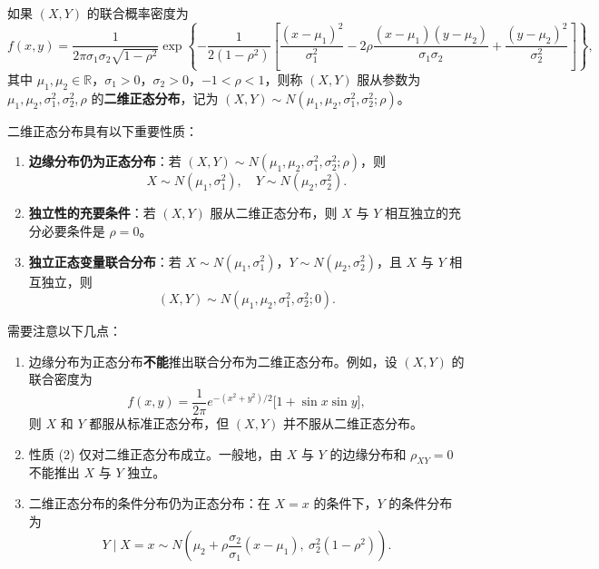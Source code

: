 ﻿\documentclass[lang=cn,11pt]{elegantbook}
\begin{document}
\begin{definition}[二维正态分布] \label{def:2d-normal}
如果 $(X,Y)$ 的联合概率密度为
\[
f(x,y) = \frac{1}{2\pi\sigma_1\sigma_2\sqrt{1-\rho^2}}\exp\left\{-\frac{1}{2(1-\rho^2)}\left[\frac{(x-\mu_1)^2}{\sigma_1^2} - 2\rho\frac{(x-\mu_1)(y-\mu_2)}{\sigma_1\sigma_2} + \frac{(y-\mu_2)^2}{\sigma_2^2}\right]\right\},
\]
其中 $\mu_1, \mu_2 \in \mathbb{R}$，$\sigma_1 > 0$，$\sigma_2 > 0$，$-1 < \rho < 1$，则称 $(X,Y)$ 服从参数为 $\mu_1, \mu_2, \sigma_1^2, \sigma_2^2, \rho$ 的\textbf{二维正态分布}，记为 $(X,Y) \sim N(\mu_1, \mu_2, \sigma_1^2, \sigma_2^2; \rho)$。
\end{definition}

\begin{property}\label{prop:2d-normal}
二维正态分布具有以下重要性质：
\begin{enumerate}
    \item \textbf{边缘分布仍为正态分布}：若 $(X,Y) \sim N(\mu_1, \mu_2, \sigma_1^2, \sigma_2^2; \rho)$，则
    \[
    X \sim N(\mu_1, \sigma_1^2), \quad Y \sim N(\mu_2, \sigma_2^2).
    \]
    \item \textbf{独立性的充要条件}：若 $(X,Y)$ 服从二维正态分布，则 $X$ 与 $Y$ 相互独立的充分必要条件是 $\rho = 0$。
    \item \textbf{独立正态变量联合分布}：若 $X \sim N(\mu_1, \sigma_1^2)$，$Y \sim N(\mu_2, \sigma_2^2)$，且 $X$ 与 $Y$ 相互独立，则
    \[
    (X,Y) \sim N(\mu_1, \mu_2, \sigma_1^2, \sigma_2^2; 0).
    \]
\end{enumerate}
\end{property}

\begin{note}
需要注意以下几点：
\begin{enumerate}
    \item 边缘分布为正态分布\textbf{不能}推出联合分布为二维正态分布。例如，设 $(X,Y)$ 的联合密度为
    \[
    f(x,y) = \frac{1}{2\pi}e^{-(x^2+y^2)/2}\bigl[1 + \sin x\sin y\bigr],
    \]
    则 $X$ 和 $Y$ 都服从标准正态分布，但 $(X,Y)$ 并不服从二维正态分布。
    \item 性质 (2) 仅对二维正态分布成立。一般地，由 $X$ 与 $Y$ 的边缘分布和 $\rho_{XY} = 0$ 不能推出 $X$ 与 $Y$ 独立。
    \item 二维正态分布的条件分布仍为正态分布：在 $X = x$ 的条件下，$Y$ 的条件分布为
    \[
    Y \mid X=x \sim N\!\left(\mu_2 + \rho\frac{\sigma_2}{\sigma_1}(x-\mu_1),\ \sigma_2^2(1-\rho^2)\right).
    \]
\end{enumerate}
\end{note}
\end{document}
